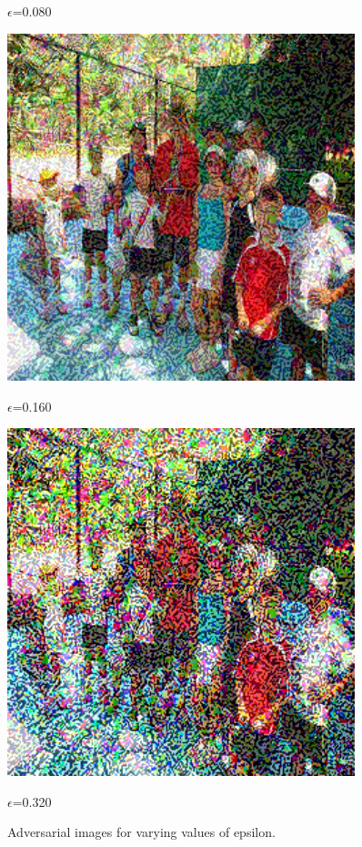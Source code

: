 \begin{figure}[h]
\begin{minipage}{0.12\textwidth}
        \caption*{$\epsilon$=0.080}
    \end{minipage}\hfill
    \begin{minipage}{0.12\textwidth}
        \centering
        \includegraphics[width=0.9\textwidth]{figures/group_of_people/group_of_people_0.160.png}
        \caption*{$\epsilon$=0.160}
    \end{minipage}\hfill
    \begin{minipage}{0.12\textwidth}
        \centering
        \includegraphics[width=0.9\textwidth]{figures/group_of_people/group_of_people_0.320.png}
        \caption*{$\epsilon$=0.320}
    \end{minipage}\hfill
    \caption{Adversarial images for varying values of epsilon.}
    \label{epsilon_on_images}
\end{figure}


